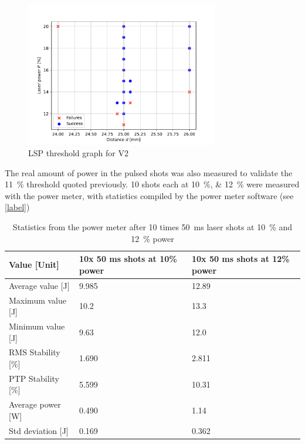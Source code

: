         \begin{figure}[!ht]
            \centering
            \includegraphics[width=0.75\textwidth]{assets/4 experiments/V2_focus_threshold.pdf}
            \caption{LSP threshold graph for V2}
        \end{figure}

        The real amount of power in the pulsed shots was also measured to validate the \qty{11}{\%} threshold quoted previously. 10 shots each at \qtylist{10; 12}{\%} were measured with the power meter, with statistics compiled by the power meter software (see \autoref{label})

        \begin{table}[!ht]
            \caption{Statistics from the power meter after 10 times \qty{50}{ms} laser shots at \qty{10}{\%} and \qty{12}{\%} power}
            \label{tab:laser shot statistics}
            \begin{tabular}{lll}
            \textbf{Value {[}Unit{]}} & \textbf{10x 50 ms shots at 10\% power} & \textbf{10x 50 ms shots at 12\% power} \\ \hline
            Average value {[}J{]}  & 9.985 & 12.89 \\
            Maximum value {[}J{]}  & 10.2  & 13.3  \\
            Minimum value {[}J{]}  & 9.63  & 12.0  \\
            RMS Stability {[}\%{]} & 1.690 & 2.811 \\
            PTP Stability {[}\%{]} & 5.599 & 10.31 \\
            Average power {[}W{]}  & 0.490 & 1.14  \\
            Std deviation {[}J{]}  & 0.169 & 0.362 \\ \hline
            \end{tabular}
        \end{table}
        
